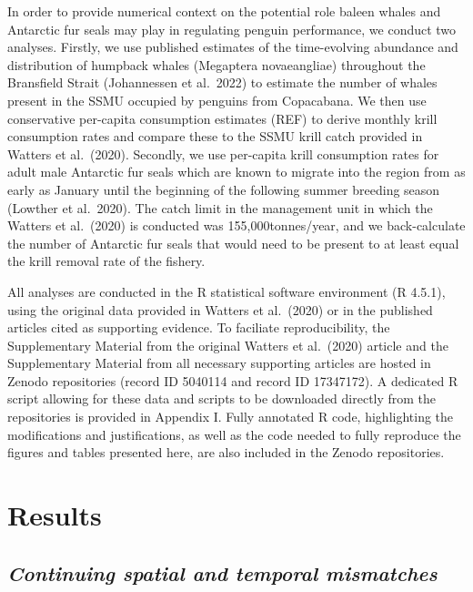 \documentclass[]{elsarticle} %
\begin{document}
In order to provide numerical context on the potential role baleen
whales and Antarctic fur seals may play in regulating penguin
performance, we conduct two analyses. Firstly, we use published
estimates of the time-evolving abundance and distribution of humpback
whales (Megaptera novaeangliae) throughout the Bransfield Strait
(Johannessen et al.~2022) to estimate the number of whales present in
the SSMU occupied by penguins from Copacabana. We then use conservative
per-capita consumption estimates (REF) to derive monthly krill
consumption rates and compare these to the SSMU krill catch provided in
Watters et al.~(2020). Secondly, we use per-capita krill consumption
rates for adult male Antarctic fur seals which are known to migrate into
the region from as early as January until the beginning of the following
summer breeding season (Lowther et al.~2020). The catch limit in the
management unit in which the Watters et al.~(2020) is conducted was
155,000tonnes/year, and we back-calculate the number of Antarctic fur
seals that would need to be present to at least equal the krill removal
rate of the fishery.

All analyses are conducted in the R statistical software environment (R
4.5.1), using the original data provided in Watters et al.~(2020) or in
the published articles cited as supporting evidence. To faciliate
reproducibility, the Supplementary Material from the original Watters et
al.~(2020) article and the Supplementary Material from all necessary
supporting articles are hosted in Zenodo repositories (record ID 5040114
and record ID 17347172). A dedicated R script allowing for these data
and scripts to be downloaded directly from the repositories is provided
in Appendix I. Fully annotated R code, highlighting the modifications
and justifications, as well as the code needed to fully reproduce the
figures and tables presented here, are also included in the Zenodo
repositories.

\section{Results}\label{results}

\subsection{\texorpdfstring{\emph{Continuing spatial and temporal
mismatches}}{Continuing spatial and temporal mismatches}}\label{continuing-spatial-and-temporal-mismatches-1}
\end{document}
